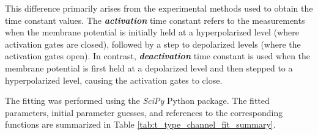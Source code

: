 \documentclass[../main.tex]{subfiles}
\begin{document}
This difference primarily arises from the experimental methods used to obtain the time constant values. The \textbf{\textit{activation}} time constant refers to the measurements when the membrane potential is initially held at a hyperpolarized level (where activation gates are closed), followed by a step to depolarized levels (where the activation gates open). In contrast, \textbf{\textit{deactivation}} time constant is used when the membrane potential is first held at a depolarized level and then stepped to a hyperpolarized level, causing the activation gates to close.

The fitting was performed using the \textit{SciPy} Python package. The fitted parameters, initial parameter guesses, and references to the corresponding functions are summarized in Table \ref{tab:t_type_channel_fit_summary}.
\end{document}
